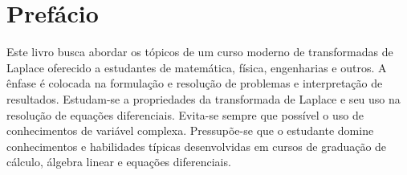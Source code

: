 
\chapter*{Prefácio}

Este livro busca abordar os tópicos de um curso moderno de transformadas de Laplace oferecido a estudantes de matemática, física, engenharias e outros. A ênfase é colocada na formulação e resolução de problemas e interpretação de resultados. Estudam-se a propriedades da transformada de Laplace e seu uso na resolução de equações diferenciais. Evita-se sempre que possível o uso de conhecimentos de variável complexa. Pressupõe-se que o estudante domine conhecimentos e habilidades típicas desenvolvidas em cursos de graduação de cálculo, álgebra linear e equações diferenciais. 

